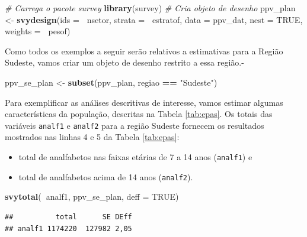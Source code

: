 \documentclass[]{book}
\newenvironment{Shaded}{\begin{snugshade}}{\end{snugshade}}
\newcommand{\KeywordTok}[1]{\textcolor[rgb]{0.13,0.29,0.53}{\textbf{#1}}}
\newcommand{\DataTypeTok}[1]{\textcolor[rgb]{0.13,0.29,0.53}{#1}}
\newcommand{\StringTok}[1]{\textcolor[rgb]{0.31,0.60,0.02}{#1}}
\newcommand{\CommentTok}[1]{\textcolor[rgb]{0.56,0.35,0.01}{\textit{#1}}}
\newcommand{\OtherTok}[1]{\textcolor[rgb]{0.56,0.35,0.01}{#1}}
\newcommand{\OperatorTok}[1]{\textcolor[rgb]{0.81,0.36,0.00}{\textbf{#1}}}
\newcommand{\NormalTok}[1]{#1}
\providecommand{\tightlist}{%
  \setlength{\itemsep}{0pt}\setlength{\parskip}{0pt}}
\theoremstyle{definition}
\theoremstyle{definition}
\theoremstyle{definition}
\theoremstyle{remark}
\begin{document}
\begin{Shaded}
\begin{Highlighting}[]
\CommentTok{# Carrega o pacote survey}
\KeywordTok{library}\NormalTok{(survey)}
\CommentTok{# Cria objeto de desenho}
\NormalTok{ppv_plan <-}\StringTok{ }\KeywordTok{svydesign}\NormalTok{(}\DataTypeTok{ids =} \OperatorTok{~}\NormalTok{nsetor, }\DataTypeTok{strata =} \OperatorTok{~}\NormalTok{estratof, }\DataTypeTok{data =}\NormalTok{ ppv_dat, }
                      \DataTypeTok{nest =} \OtherTok{TRUE}\NormalTok{, }\DataTypeTok{weights =} \OperatorTok{~}\NormalTok{pesof)}
\end{Highlighting}
\end{Shaded}

Como todos os exemplos a seguir serão relativos a estimativas para a
Região Sudeste, vamos criar um objeto de desenho restrito a essa
região.-

\begin{Shaded}
\begin{Highlighting}[]
\NormalTok{ppv_se_plan <-}\StringTok{ }\KeywordTok{subset}\NormalTok{(ppv_plan, regiao }\OperatorTok{==}\StringTok{ "Sudeste"}\NormalTok{)}
\end{Highlighting}
\end{Shaded}

Para exemplificar as análises descritivas de interesse, vamos estimar
algumas características da população, descritas na Tabela
\ref{tab:epas}. Os totais das variáveis \texttt{analf1} e
\texttt{analf2} para a região Sudeste fornecem os resultados mostrados
nas linhas 4 e 5 da Tabela \ref{tab:epas}:

\begin{itemize}
\tightlist
\item
  total de analfabetos nas faixas etárias de 7 a 14 anos
  (\texttt{analf1}) e
\item
  total de analfabetos acima de 14 anos (\texttt{analf2}).
\end{itemize}

\begin{Shaded}
\begin{Highlighting}[]
\KeywordTok{svytotal}\NormalTok{(}\OperatorTok{~}\NormalTok{analf1, ppv_se_plan, }\DataTypeTok{deff =} \OtherTok{TRUE}\NormalTok{)}
\end{Highlighting}
\end{Shaded}

\begin{verbatim}
##          total      SE DEff
## analf1 1174220  127982 2,05
\end{verbatim}
\end{document}
